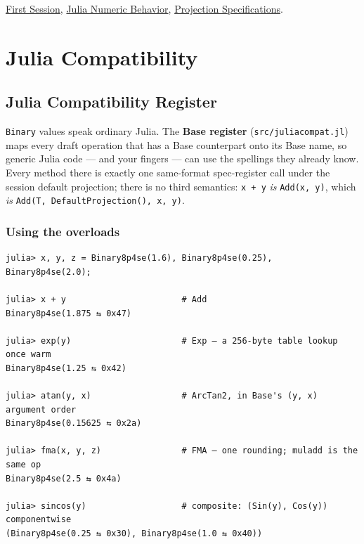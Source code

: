 \label{292862844209942199-dup14}{}


\href{first\_\allowbreak{}session.md}{First Session}, \href{concept\_\allowbreak{}julia\_\allowbreak{}numeric.md}{Julia Numeric Behavior}, \href{reference\_\allowbreak{}projections.md}{Projection Specifications}.



\chapter{Julia Compatibility}


\section{Julia Compatibility Register}



\label{1477926021903186663}{}


\texttt{Binary} values speak ordinary Julia. The \textbf{Base register} (\texttt{src/juliacompat.jl}) maps every draft operation that has a Base counterpart onto its Base name, so generic Julia code — and your fingers — can use the spellings they already know. Every method there is exactly one same-format spec-register call under the session default projection; there is no third semantics: \texttt{x + y} \emph{is} \texttt{Add(x, y)}, which \emph{is} \texttt{Add(\allowbreak{}T, DefaultProjection(\allowbreak{}), x, y)}.



\subsection{Using the overloads}



\label{5063837776835138997}{}



\begin{verbatim}
julia> x, y, z = Binary8p4se(1.6), Binary8p4se(0.25), Binary8p4se(2.0);

julia> x + y                       # Add
Binary8p4se(1.875 ⇆ 0x47)

julia> exp(y)                      # Exp — a 256-byte table lookup once warm
Binary8p4se(1.25 ⇆ 0x42)

julia> atan(y, x)                  # ArcTan2, in Base's (y, x) argument order
Binary8p4se(0.15625 ⇆ 0x2a)

julia> fma(x, y, z)                # FMA — one rounding; muladd is the same op
Binary8p4se(2.5 ⇆ 0x4a)

julia> sincos(y)                   # composite: (Sin(y), Cos(y)) componentwise
(Binary8p4se(0.25 ⇆ 0x30), Binary8p4se(1.0 ⇆ 0x40))
\end{verbatim}



